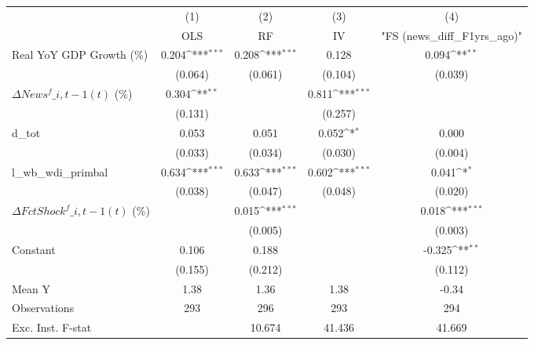 {
\def\sym#1{\ifmmode^{#1}\else\(^{#1}\)\fi}
\begin{tabular}{l*{4}{c}}
\toprule
                    &\multicolumn{1}{c}{(1)}&\multicolumn{1}{c}{(2)}&\multicolumn{1}{c}{(3)}&\multicolumn{1}{c}{(4)}\\
                    &\multicolumn{1}{c}{OLS}&\multicolumn{1}{c}{RF}&\multicolumn{1}{c}{IV}&\multicolumn{1}{c}{ "FS (news\_diff\_F1yrs\_ago)" }\\
\midrule
Real YoY GDP Growth (\%)&       0.204\sym{***}&       0.208\sym{***}&       0.128         &       0.094\sym{**} \\
                    &     (0.064)         &     (0.061)         &     (0.104)         &     (0.039)         \\
\addlinespace
$ \Delta News^f\_{i,t-1}(t)$ (\%)&       0.304\sym{**} &                     &       0.811\sym{***}&                     \\
                    &     (0.131)         &                     &     (0.257)         &                     \\
\addlinespace
d\_tot               &       0.053         &       0.051         &       0.052\sym{*}  &       0.000         \\
                    &     (0.033)         &     (0.034)         &     (0.030)         &     (0.004)         \\
\addlinespace
l\_wb\_wdi\_primbal    &       0.634\sym{***}&       0.633\sym{***}&       0.602\sym{***}&       0.041\sym{*}  \\
                    &     (0.038)         &     (0.047)         &     (0.048)         &     (0.020)         \\
\addlinespace
$ \Delta FctShock^f\_{i,t-1}(t)$ (\%)&                     &       0.015\sym{***}&                     &       0.018\sym{***}\\
                    &                     &     (0.005)         &                     &     (0.003)         \\
\addlinespace
Constant            &       0.106         &       0.188         &                     &      -0.325\sym{**} \\
                    &     (0.155)         &     (0.212)         &                     &     (0.112)         \\
\midrule
Mean Y              &        1.38         &        1.36         &        1.38         &       -0.34         \\
Observations        &         293         &         296         &         293         &         294         \\
Exc. Inst. F-stat   &                     &      10.674         &      41.436         &      41.669         \\
\bottomrule
\end{tabular}
}
